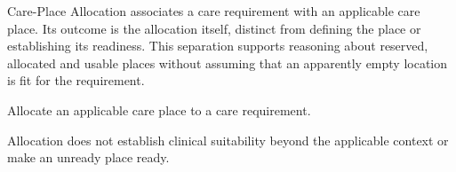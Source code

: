 Care-Place Allocation associates a care requirement with an applicable care place. Its outcome is the allocation itself, distinct from defining the place or establishing its readiness. This separation supports reasoning about reserved, allocated and usable places without assuming that an apparently empty location is fit for the requirement.



Allocate an applicable care place to a care requirement.



Allocation does not establish clinical suitability beyond the applicable context or make an unready place ready.


